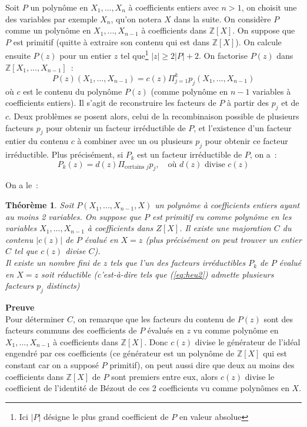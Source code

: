 \documentclass[a4paper,11pt]{article}
\newtheorem{thm}{Théorème}
\newcommand{\Z}{{\mathbb{Z}}}
\begin{document}
\begin{giacjshere}
Soit $P$ un polynôme en $X_1,...,X_n$ à coefficients entiers avec $n>1$,
on choisit une des variables par exemple $X_n$, qu'on notera $X$ dans la suite.
On considère $P$ comme un polynôme en $X_1,...,X_{n-1}$ à coefficients dans 
$\Z[X]$. On suppose que $P$ est primitif (quitte à extraire
son contenu qui est dans $\Z[X]$). On calcule ensuite
$P(z)$ pour un entier $z$ tel que\footnote{Ici $|P|$ désigne le plus grand
coefficient de $P$ en valeur absolue} $|z| \geq 2|P|+2$. On factorise $P(z)$
dans $\Z[X_1,...,X_{n-1}]$~:
\begin{equation} \label{eq:heu1}
 P(z)(X_1,...,X_{n-1})=c(z) \Pi_{j=1}^k p_j(X_1,...,X_{n-1})
\end{equation}
où $c$ est le contenu du polynôme $P(z)$ (comme polynôme en $n-1$ 
variables à coefficients entiers). Il s'agit de reconstruire les facteurs
de $P$ à partir des $p_j$ et de $c$. Deux problèmes se posent alors,
celui de la recombinaison possible de plusieurs facteurs $p_j$ pour
obtenir un facteur irréductible de $P$, et l'existence d'un facteur entier du
contenu $c$ à combiner avec un ou plusieurs $p_j$ pour obtenir ce
facteur irréductible. Plus précisément, si $P_k$ est un facteur 
irréductible de $P$, on a~:
\begin{equation} \label{eq:heu2}
 P_k(z)=d(z) \Pi_{\mbox{certains } j} p_j, \quad \mbox{où } 
d(z) \mbox{ divise } c(z)
\end{equation}

On a le~:
\begin{thm}
Soit $P(X_1,...,X_{n-1},X)$ un polynôme à coefficients 
entiers ayant au moins 2 variables. On suppose que $P$ est primitif
vu comme polynôme en les variables $X_1,...,X_{n-1}$
à coefficients dans $Z[X]$.
Il existe une majoration $C$ du contenu $|c(z)|$ de $P$ évalué en $X=z$
(plus précisément on peut trouver un entier $C$ tel que $c(z)$ divise
$C$).\\
Il existe un nombre fini de $z$ tels que l'un des facteurs irréductibles
$P_k$ de $P$ évalué en $X=z$ soit
réductible (c'est-à-dire tels que (\ref{eq:heu2}) admette 
plusieurs facteurs $p_j$ distincts)
\end{thm}

{\bf Preuve}\\
Pour déterminer $C$, on remarque que les facteurs du contenu de $P(z)$
sont des facteurs communs des coefficients de $P$ évalués en $z$
vu comme polynôme en $X_1,...,X_{n-1}$ à coefficients dans $\Z[X]$.
Donc $c(z)$ divise le générateur de l'idéal engendré par ces coefficients
(ce générateur est un polynôme de $\Z[X]$ qui est constant car on a supposé
$P$ primitif), on peut aussi dire que deux au moins des coefficients
dans $\Z[X]$ de $P$ sont premiers entre eux, alors $c(z)$ divise le
coefficient de l'identité de Bézout de ces 2 coefficients vu
comme polynômes en $X$.


\end{giacjshere}
\end{document}
